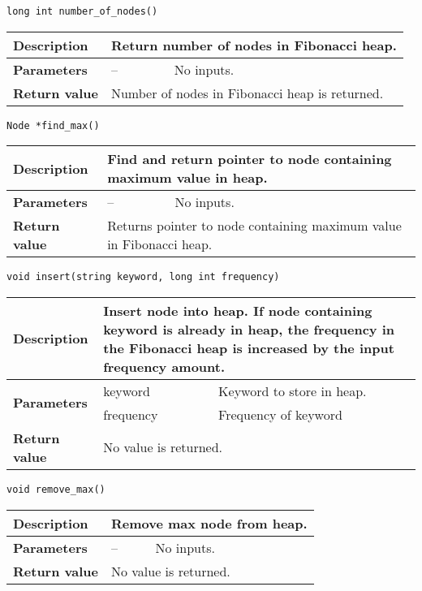 \documentclass[12pt, reqno]{amsart}
\begin{document}
{\large \texttt{long int number\_of\_nodes()}}
\begin{center}
    \begin{tabular}{| l | p{2.5cm} | p{9.5cm} |}
    \hline
    {\bfseries Description} & \multicolumn{2}{p{12.5cm}|}{Return number of nodes in Fibonacci heap.} \\ \hline
    \multirow{1}{*}{\bfseries Parameters} & -- & No inputs. \\ \hline
    {\bfseries Return value} & \multicolumn{2}{p{12.5cm}|}{Number of nodes in Fibonacci heap is returned.} \\ \hline
    \end{tabular}
\end{center}

{\large \texttt{Node *find\_max()}}
\begin{center}
    \begin{tabular}{| l | p{2.5cm} | p{9.5cm} |}
    \hline
    {\bfseries Description} & \multicolumn{2}{p{12.5cm}|}{Find and return pointer to node containing maximum value in heap.} \\ \hline
    \multirow{1}{*}{\bfseries Parameters} & -- & No inputs. \\ \hline
    {\bfseries Return value} & \multicolumn{2}{p{12.5cm}|}{Returns pointer to node containing maximum value in Fibonacci heap.} \\ \hline
    \end{tabular}
\end{center}

{\large \texttt{void insert(string keyword, long int frequency)}}
\begin{center}
    \begin{tabular}{| l | p{2.5cm} | p{9.5cm} |}
    \hline
    {\bfseries Description} & \multicolumn{2}{p{12.5cm}|}{Insert node into heap. If node containing keyword is already in heap, the frequency in the Fibonacci heap is increased by the input frequency amount.} \\ \hline
    \multirow{2}{*}{\bfseries Parameters} & keyword & Keyword to store in heap. \\ \cline{2-3}
    & frequency & Frequency of keyword \\ \hline
    {\bfseries Return value} & \multicolumn{2}{p{12.5cm}|}{No value is returned.} \\ \hline
    \end{tabular}
\end{center}
    
{\large \texttt{void remove\_max()}}
\begin{center}
    \begin{tabular}{| l | p{2.5cm} | p{9.5cm} |}
    \hline
    {\bfseries Description} & \multicolumn{2}{p{12.5cm}|}{Remove max node from heap.} \\ \hline
    \multirow{1}{*}{\bfseries Parameters} & -- & No inputs. \\ \hline
    {\bfseries Return value} & \multicolumn{2}{p{12.5cm}|}{No value is returned.} \\ \hline
    \end{tabular}
\end{center}
\end{document}
